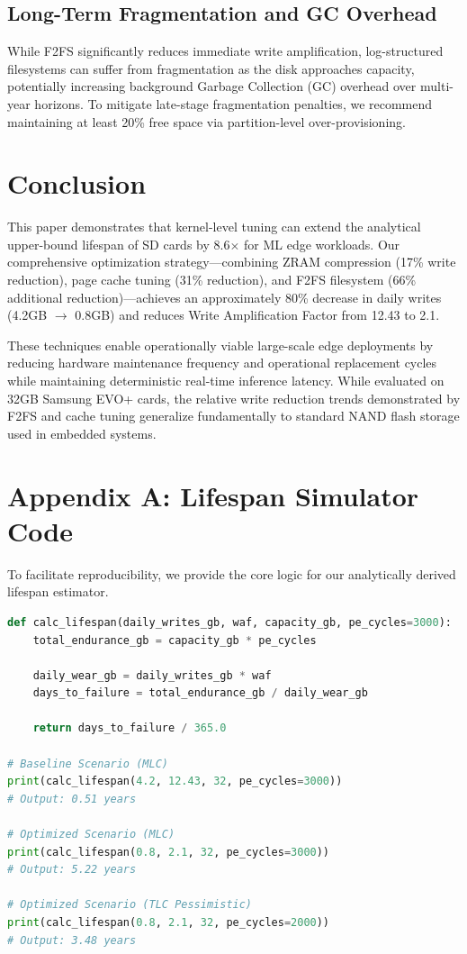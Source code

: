\documentclass[conference]{IEEEtran}
\begin{document}
\subsection{Long-Term Fragmentation and GC Overhead}
While F2FS significantly reduces immediate write amplification, log-structured filesystems can suffer from fragmentation as the disk approaches capacity, potentially increasing background Garbage Collection (GC) overhead over multi-year horizons. To mitigate late-stage fragmentation penalties, we recommend maintaining at least 20\% free space via partition-level over-provisioning.

\section{Conclusion}

This paper demonstrates that kernel-level tuning can extend the analytical upper-bound lifespan of SD cards by 8.6$\times$ for ML edge workloads. Our comprehensive optimization strategy---combining ZRAM compression (17\% write reduction), page cache tuning (31\% reduction), and F2FS filesystem (66\% additional reduction)---achieves an approximately 80\% decrease in daily writes (4.2GB $\to$ 0.8GB) and reduces Write Amplification Factor from 12.43 to 2.1.

These techniques enable operationally viable large-scale edge deployments by reducing hardware maintenance frequency and operational replacement cycles while maintaining deterministic real-time inference latency. While evaluated on 32GB Samsung EVO+ cards, the relative write reduction trends demonstrated by F2FS and cache tuning generalize fundamentally to standard NAND flash storage used in embedded systems.

\section*{Appendix A: Lifespan Simulator Code}
To facilitate reproducibility, we provide the core logic for our analytically derived lifespan estimator.

\begin{lstlisting}[language=Python, caption={Python Lifespan Estimator}]
def calc_lifespan(daily_writes_gb, waf, capacity_gb, pe_cycles=3000):
    total_endurance_gb = capacity_gb * pe_cycles
      
    daily_wear_gb = daily_writes_gb * waf
    days_to_failure = total_endurance_gb / daily_wear_gb
      
    return days_to_failure / 365.0

# Baseline Scenario (MLC)
print(calc_lifespan(4.2, 12.43, 32, pe_cycles=3000)) 
# Output: 0.51 years

# Optimized Scenario (MLC)
print(calc_lifespan(0.8, 2.1, 32, pe_cycles=3000))   
# Output: 5.22 years

# Optimized Scenario (TLC Pessimistic)
print(calc_lifespan(0.8, 2.1, 32, pe_cycles=2000))   
# Output: 3.48 years
\end{lstlisting}
\end{document}
